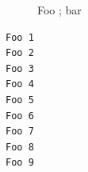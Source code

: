 \documentclass{article}
\begin{document}
\begin{figure}
  \caption{Foo ; bar}
\end{figure}
\lipsum[1-4]
\begin{lstlisting}
Foo 1
Foo 2
Foo 3
Foo 4
Foo 5
Foo 6
Foo 7
Foo 8
Foo 9
\end{lstlisting}
\end{document}
